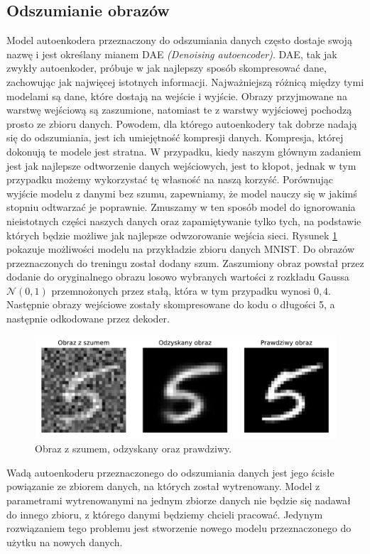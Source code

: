 \documentclass[a4paper,12pt,oneside]{book} %
\begin{document}
\subsection{Odszumianie obrazów}
Model autoenkodera przeznaczony do odszumiania danych często dostaje swoją nazwę i jest określany mianem DAE \textit{(Denoising autoencoder)}. DAE, tak jak zwykły autoenkoder, próbuje w jak najlepszy sposób skompresować dane, zachowując jak najwięcej istotnych informacji. Najważniejszą różnicą między tymi modelami są dane, które dostają na wejście i wyjście. Obrazy przyjmowane na warstwę wejściową są zaszumione, natomiast te z warstwy wyjściowej pochodzą prosto ze zbioru danych.
Powodem, dla którego autoenkodery tak dobrze nadają się do odszumiania, jest ich umiejętność kompresji danych. Kompresja, której dokonują te modele jest stratna. W przypadku, kiedy naszym głównym zadaniem jest jak najlepsze odtworzenie danych wejściowych, jest to kłopot, jednak w tym przypadku możemy wykorzystać tę własność na naszą korzyść. Porównując wyjście modelu z danymi bez szumu, zapewniamy, że model nauczy się w jakimś stopniu odtwarzać je poprawnie. Zmuszamy w ten sposób model do ignorowania nieistotnych części naszych danych oraz zapamiętywanie tylko tych, na podstawie których będzie możliwe jak najlepsze odwzorowanie wejścia sieci.
Rysunek \ref{fig:noisedae} pokazuje możliwości modelu na przykładzie zbioru danych MNIST. Do obrazów przeznaczonych do treningu został dodany szum. Zaszumiony obraz powstał przez dodanie do oryginalnego obrazu losowo wybranych wartości z rozkładu Gaussa $\mathcal{N}(0,1)$ przemnożonych przez stałą, która w tym przypadku wynosi $0,4$. Następnie obrazy wejściowe zostały skompresowane do kodu o długości 5, a następnie odkodowane przez dekoder. 
\begin{figure}[h!]
	\centering\includegraphics[width=14.5cm]{denoisingae.pdf}
	\caption{Obraz z szumem, odzyskany oraz prawdziwy.}
	\label{fig:noisedae}
\end{figure}

Wadą autoenkoderu przeznaczonego do odszumiania danych jest jego ścisłe powiązanie ze zbiorem danych, na których został wytrenowany. Model z parametrami wytrenowanymi na jednym zbiorze danych nie będzie się nadawał do innego zbioru, z którego danymi będziemy chcieli pracować. Jedynym rozwiązaniem tego problemu jest stworzenie nowego modelu przeznaczonego do użytku na nowych danych. 
\end{document}
